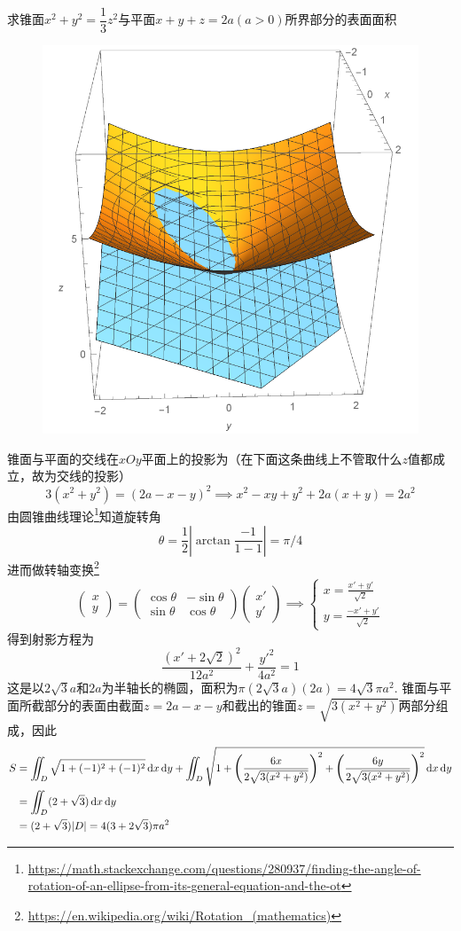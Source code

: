 \begin{example}
求锥面$x^2+y^2=\dfrac{1}{3}z^2$与平面$x+y+z=2a(a>0)$所界部分的表面面积
\end{example}
\begin{analysis}
\begin{figure}[H]
\centering
\includegraphics[width=0.3\linewidth]{fig/surface_area_eg.pdf}
\end{figure}
锥面与平面的交线在$xOy$平面上的投影为（在下面这条曲线上不管取什么$z$值都成立，故为交线的投影）
\[3(x^2+y^2)=(2a-x-y)^2\implies x^2-xy+y^2+2a(x+y)=2a^2\]
由圆锥曲线理论\footnote{\url{https://math.stackexchange.com/questions/280937/finding-the-angle-of-rotation-of-an-ellipse-from-its-general-equation-and-the-ot}}知道旋转角
\[\theta=\frac{1}{2}\left|\arctan\frac{-1}{1-1}\right|=\pi/4\]
进而做转轴变换\footnote{\url{https://en.wikipedia.org/wiki/Rotation_(mathematics)}}
\[\begin{pmatrix}x\\y\end{pmatrix}=\begin{pmatrix}\cos\theta&-\sin\theta\\\sin\theta&\cos\theta\end{pmatrix}\begin{pmatrix}x'\\y'\end{pmatrix}\implies\begin{cases}x=\frac{x'+y'}{\sqrt{2}}\\y=\frac{-x'+y'}{\sqrt{2}}\end{cases}\]
得到射影方程为
\[\frac{(x'+2\sqrt{2})^2}{12a^2}+\frac{y'^2}{4a^2}=1\]
这是以$2\sqrt{3}a$和$2a$为半轴长的椭圆，面积为$\pi(2\sqrt{3}a)(2a)=4\sqrt{3}\pi a^2$.
锥面与平面所截部分的表面由截面$z=2a-x-y$和截出的锥面$z=\sqrt{3(x^2+y^2)}$两部分组成，因此
\[\begin{aligned}
S&=\iint_{D}\sqrt{1+(-1)^2+(-1)^2}\,\mathrm{d} x\,\mathrm{d} y+\iint_D\sqrt{1+\left(\frac{6x}{2\sqrt{3(x^2+y^2)}}\right)^2+\left(\frac{6y}{2\sqrt{3(x^2+y^2)}}\right)^2}\,\mathrm{d} x\,\mathrm{d} y\\
&=\iint_D(2+\sqrt{3})\,\mathrm{d} x\,\mathrm{d} y\\
&=(2+\sqrt{3})|D|=4(3+2\sqrt{3})\pi a^2
\end{aligned}\]
\end{analysis}

